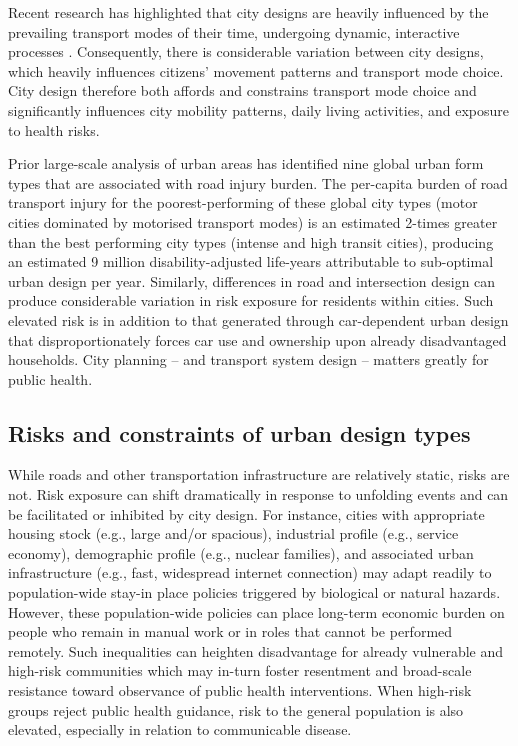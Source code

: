 \documentclass[preprint,10pt]{elsarticle} %
\begin{document}
Recent research has highlighted that city designs are heavily influenced by the prevailing transport modes of their time\cite{KNOWLES2020102607}, undergoing dynamic, interactive processes \cite{Strano2012}. Consequently, there is considerable variation between city designs, which heavily influences citizens' movement patterns and transport mode choice\cite{Thompson2020}. City design therefore both affords and constrains transport mode choice and significantly influences city mobility patterns, daily living activities, and exposure to health risks\cite{WHO2023}.

Prior large-scale analysis of urban areas has identified nine global urban form types that are associated with road injury burden\cite{Thompson2020}. The per-capita burden of road transport injury for the poorest-performing of these global city types (motor cities dominated by motorised transport modes) is an estimated 2-times greater than the best performing city types (intense and high transit cities), producing an estimated 9 million disability-adjusted life-years attributable to sub-optimal urban design per year\cite{Thompson2020}. Similarly, differences in road and intersection design can produce considerable variation in risk exposure for residents within cities\cite{Wijnands_IntersectionDesign2021,MORRISON2019123}. Such elevated risk is in addition to that generated through car-dependent urban design that disproportionately forces car use and ownership upon already disadvantaged households\cite{currie2018alarming, CURL201861}. City planning -- and transport system design -- matters greatly for public health.



\subsection*{Risks and constraints of urban design types}
While roads and other transportation infrastructure are relatively static, risks are not. Risk exposure can shift dramatically in response to unfolding events and can be facilitated or inhibited by city design. For instance, cities with appropriate housing stock (e.g., large and/or spacious), industrial profile (e.g., service economy), demographic profile (e.g., nuclear families), and associated urban infrastructure (e.g., fast, widespread internet connection) may adapt readily to population-wide stay-in place policies triggered by biological or natural hazards\cite{hale2021global}. However, these population-wide policies can place long-term economic burden on people who remain in manual work or in roles that cannot be performed remotely\cite{CraigWFH,Vyas2021}. Such inequalities can heighten disadvantage for already vulnerable and high-risk communities\cite{martin2020fighting} which may in-turn foster resentment and broad-scale resistance toward observance of public health interventions\cite{de2016sustainability}. When high-risk groups reject public health guidance, risk to the general population is also elevated, especially in relation to communicable disease\cite{koopman2005control}.
\end{document}
